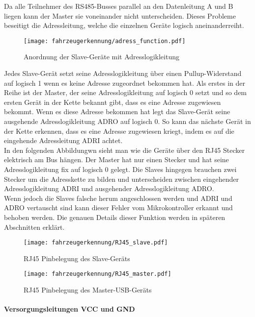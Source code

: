 Da alle Teilnehmer des RS485-Busses parallel an den Datenleitung A und B liegen kann der Master sie voneinander nicht unterscheiden. Dieses Probleme beseitigt die Adressleitung, welche
die einzelnen Geräte logisch aneinanderreiht.

\begin{figure}[H]
    \centering
    \texttt{[image: fahrzeugerkennung/adress\_function.pdf]}
    \caption{Anordnung der Slave-Geräte mit Adresslogikleitung}
\end{figure}

Jedes Slave-Gerät setzt seine Adresslogikleitung über einen Pullup-Widerstand auf logisch 1 wenn es keine Adresse zugeordnet bekommen hat.
Als erstes in der Reihe ist der Master, der seine Adresslogikleitung auf logisch 0 setzt und so dem ersten Gerät in der Kette bekannt gibt, dass es eine Adresse zugewiesen bekommt. Wenn es
diese Adresse bekommen hat legt das Slave-Gerät seine ausgehende Adresslogikleitung ADRO auf logisch 0. So kann das nächste Gerät in der Kette erkennen, dass es eine Adresse zugewiesen kriegt, 
indem es auf die eingehende Adressleitung ADRI achtet.\\
In den folgenden Abbildungwn sieht man wie die Geräte über den RJ45 Stecker elektrisch am Bus hängen. Der Master hat nur einen Stecker und hat seine Adresslogikleitung fix auf logisch 0 gelegt.
Die Slaves hingegen brauchen zwei Stecker um die Adresskette zu bilden und unterscheiden zwischen eingehender Adresslogikleitung ADRI und ausgehender Adresslogikleitung ADRO. \\
Wenn jedoch die Slaves falsche herum angeschlossen werden und ADRI und ADRO vertauscht sind kann dieser Fehler vom Mikrokontroller erkannt und behoben werden. Die genauen Details dieser Funktion 
werden in späteren Abschnitten erklärt. 

\begin{figure}[H]
    \centering
    \texttt{[image: fahrzeugerkennung/RJ45\_slave.pdf]}
    \caption{RJ45 Pinbelegung des Slave-Geräts}
\end{figure}

\begin{figure}[H]
    \centering
    \texttt{[image: fahrzeugerkennung/RJ45\_master.pdf]}
    \caption{RJ45 Pinbelegung des Master-USB-Geräts}
\end{figure}

\paragraph{Versorgungsleitungen VCC und GND}\mbox{}\\

